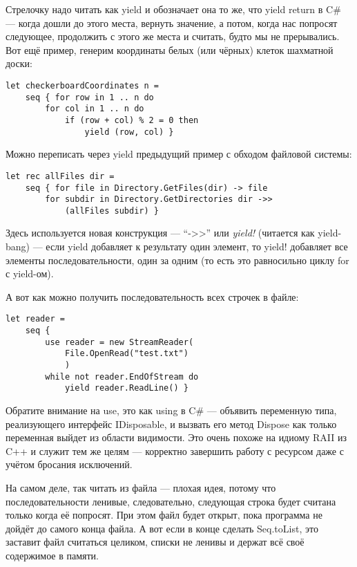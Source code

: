 \documentclass[a5paper]{article}
\begin{document}
Стрелочку надо читать как yield и обозначает она то же, что yield return в C\# --- когда дошли до этого места, вернуть значение, а потом, когда нас попросят следующее, продолжить с этого же места и считать, будто мы не прерывались. Вот ещё пример, генерим координаты белых (или чёрных) клеток шахматной доски:

\begin{verbatim}
let checkerboardCoordinates n =
    seq { for row in 1 .. n do
        for col in 1 .. n do
            if (row + col) % 2 = 0 then
                yield (row, col) }
\end{verbatim}

Можно переписать через yield предыдущий пример с обходом файловой системы:

\begin{verbatim}
let rec allFiles dir =
    seq { for file in Directory.GetFiles(dir) -> file
        for subdir in Directory.GetDirectories dir ->> 
            (allFiles subdir) }
\end{verbatim}

Здесь используется новая конструкция --- ``->>'' или \textit{yield!} (читается как yield-bang) --- если yield добавляет к результату один элемент, то yield! добавляет все элементы последовательности, один за одним (то есть это равносильно циклу for с yield-ом).

А вот как можно получить последовательность всех строчек в файле:

\begin{verbatim}
let reader =
    seq { 
        use reader = new StreamReader(
            File.OpenRead("test.txt")
            )
        while not reader.EndOfStream do
            yield reader.ReadLine() }
\end{verbatim}

Обратите внимание на use, это как using в C\# --- объявить переменную типа, реализующего интерфейс IDisposable, и вызвать его метод Dispose как только переменная выйдет из области видимости. Это очень  похоже на идиому RAII из C++ и служит тем же целям --- корректно завершить работу с ресурсом даже с учётом бросания исключений.

На самом деле, так читать из файла --- плохая идея, потому что последовательности ленивые, следовательно, следующая строка будет считана только когда её попросят. При этом файл будет открыт, пока программа не дойдёт до самого конца файла. А вот если в конце сделать Seq.toList, это заставит файл считаться целиком, списки не ленивы и держат всё своё содержимое в памяти.
\end{document}
